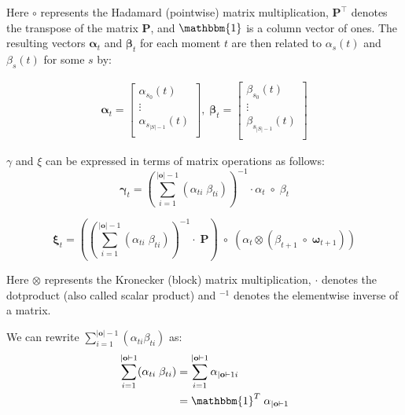 Here $\circ$ represents the Hadamard (pointwise) matrix multiplication, $\boldsymbol{P}^\top$ denotes the transpose of the matrix $\boldsymbol{P}$, and $\mathbbm{1}$ is a column vector of ones. 
The resulting vectors $\boldsymbol{\alpha}_t$ and $\boldsymbol{\beta}_t$ for each moment $t$ are then related to $\alpha_s(t)$ and $\beta_s(t)$ for some $s$ by:

\begin{align}
    \boldsymbol{\alpha}_t = \begin{bmatrix}
        \alpha_{s_0}(t)       \\
        \vdots                \\
        \alpha_{s_{|S|-1}}(t) \\
    \end{bmatrix}, \;
    \boldsymbol{\beta}_t = \begin{bmatrix}
        \beta_{s_0}(t)       \\
        \vdots                \\
        \beta_{s_{|S|-1}}(t) \\
    \end{bmatrix}
\end{align}

$\gamma$ and $\xi$ can be expressed in terms of matrix operations as follows:
\begin{equation}
    \boldsymbol{\gamma}_t = (\sum_{i=1}^{|\mathbf{o}|-1} (\alpha_{t i} \;\beta_{t i}))^{-1} \cdot \alpha_t \; \circ \; \beta_t
    \label{eq:equation21}
\end{equation}

\begin{equation}
    \boldsymbol{\xi}_t = ((\sum_{i=1}^{|\mathbf{o}|-1} (\alpha_{t i} \; \beta_{t i}))^{-1} \cdot \; \boldsymbol{P}) \; \circ \;(\alpha_t \otimes (\beta_{t+1} \; \circ \; \boldsymbol{\omega}_{t+1}))
    \label{eq:equation22}
\end{equation}

Here $\otimes$ represents the Kronecker (block) matrix multiplication, $\cdot$ denotes the dotproduct (also called scalar product) and $^{-1}$ denotes the elementwise inverse of a matrix.

We can rewrite $\sum_{i=1}^{|\mathbf{o}|-1} (\alpha_{t i} \beta_{t i})$ as:
\begin{eqnarray}
    \sum_{i=1}^{|\mathbf{o}|-1} (\alpha_{t i} \; \beta_{t i}) &= \sum_{i=1}^{|\mathbf{o}|-1} \alpha_{|\mathbf{o}|-1 i} \\
    &= \mathbbm{1}^T \; \alpha_{|\mathbf{o}|-1} 
\end{eqnarray}

